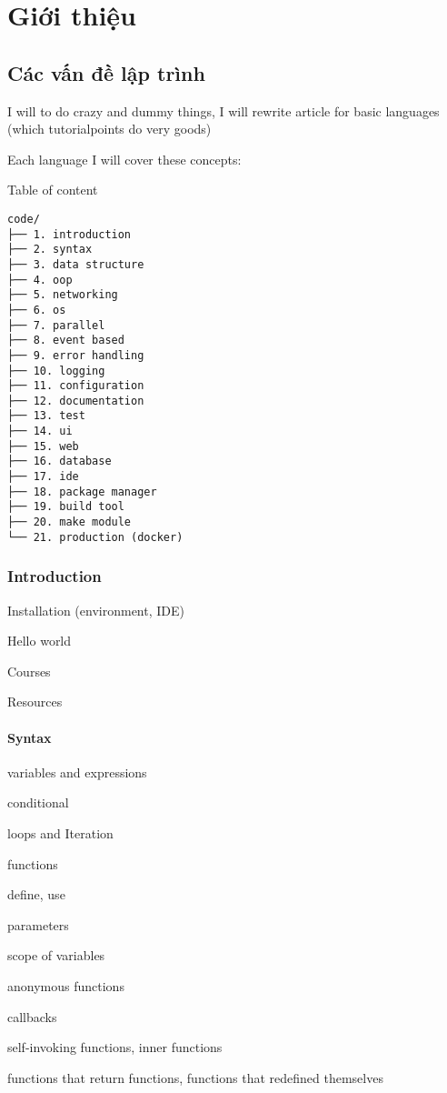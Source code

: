 \chapter{Giới thiệu}

\section{Các vấn đề lập trình}

I will to do crazy and dummy things, I will rewrite article for basic languages (which tutorialpoints do very goods)

Each language I will cover these concepts:

Table of content

\begin{lstlisting}
code/
├── 1. introduction
├── 2. syntax
├── 3. data structure
├── 4. oop
├── 5. networking
├── 6. os
├── 7. parallel
├── 8. event based
├── 9. error handling
├── 10. logging
├── 11. configuration
├── 12. documentation
├── 13. test
├── 14. ui
├── 15. web
├── 16. database
├── 17. ide
├── 18. package manager
├── 19. build tool
├── 20. make module
└── 21. production (docker)
\end{lstlisting}

\subsection{Introduction}

Installation (environment, IDE)

Hello world

Courses

Resources

\subsubsection{Syntax}

variables and expressions

conditional

loops and Iteration

functions

define, use

parameters

scope of variables

anonymous functions

callbacks

self-invoking functions, inner functions

functions that return functions, functions that redefined themselves


